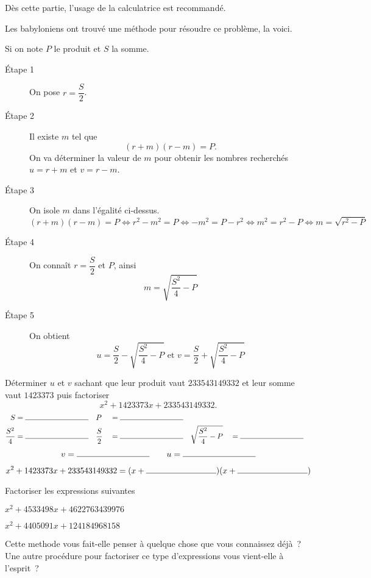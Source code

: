\documentclass[a4paper,12pt]{report}
\begin{document}
\afterpage{\bpage}
\newpage

\begin{center}
Dès cette partie, l'usage de la calculatrice est recommandé.
\end{center}

Les babyloniens ont trouvé une méthode pour résoudre ce problème, la voici.

Si on note $P$ le produit et $S$ la somme.
\begin{description}
	\item[Étape 1] On pose $r=\dfrac{S}{2}$.
	\item[Étape 2] Il existe $m$ tel que \[(r+m)(r-m)=P.\] On va déterminer la valeur de $m$ pour obtenir les nombres recherchés $u=r+m$ et $v=r-m$. 
	\item[Étape 3] On isole $m$ dans l'égalité ci-dessus.
		\[(r+m)(r-m)=P \iff r^2-m^2=P \iff -m^2=P-r^2\iff m^2=r^2-P \iff m=\sqrt{r^2-P}\]
	\item[Étape 4] On connaît $r=\dfrac{S}{2}$ et $P$, ainsi
		\[m=\sqrt{\dfrac{S^2}{4}-P}\]
	\item[Étape 5] On obtient 
		\[u=\dfrac{S}{2}-\sqrt{\dfrac{S^2}{4}-P} \text{ et } v=\dfrac{S}{2}+\sqrt{\dfrac{S^2}{4}-P}\]
\end{description}
Déterminer $u$ et $v$ sachant que leur produit vaut $233543149332$ et leur somme vaut $1423373$ puis factoriser \[x^2+1423373x+233543149332.\]
\begin{alignat*}{3}
	S&=\ligne{3}\quad  P&&=\ligne{3} &&\\ 
	\dfrac{S^2}{4}&=\ligne{3}\quad \dfrac{S}{2}&&=\ligne{3}\quad  \sqrt{\dfrac{S^2}{4}-P}&&=\ligne{3}\quad 
\end{alignat*}

	\[v=\ligne{3} \quad \quad u=\ligne{3}\]


	\[x^2+1423373x+233543149332 = (x+\ligne{3})(x+\ligne{3})\]
\begin{exo}
	Factoriser les expressions suivantes
	\begin{tasks}
		\task $x^2+4533498x+4622763439976$

\framebox[0.9\textwidth]{\rule{0pt}{170pt}}
		\task $x^2+4405091x+124184968158$

\framebox[0.9\textwidth]{\rule{0pt}{170pt}}
	\end{tasks}
\end{exo}
Cette methode vous fait-elle penser à quelque chose que vous connaissez déjà~? Une autre procédure pour factoriser ce type d'expressions vous vient-elle à l'esprit~? 
\end{document}
